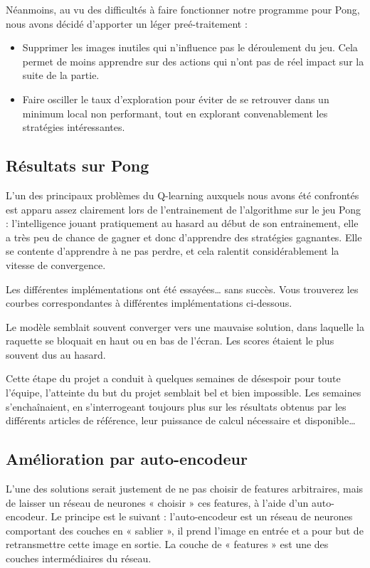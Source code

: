 \documentclass[
    10pt,
    a4paper,
    oneside,
    headinclude,footinclude,
    BCOR=5mm,
    captions=tableabove
]{scrartcl}
\begin{document}
Néanmoins, au vu des difficultés à faire fonctionner notre programme pour Pong, nous avons décidé d'apporter un léger preé-traitement :
\begin{itemize}
	\item Supprimer les images inutiles qui n'influence pas le déroulement du jeu. Cela permet de moins apprendre sur des actions qui n'ont pas de réel impact sur la suite de la partie.
	\item Faire osciller le taux d'exploration pour éviter de se retrouver dans un minimum local non performant, tout en explorant convenablement les stratégies intéressantes.
\end{itemize} 

\subsection{Résultats sur Pong}
L'un des principaux problèmes du Q-learning auxquels nous avons été confrontés est apparu assez clairement lors de l'entrainement de l'algorithme sur le jeu Pong : l'intelligence jouant pratiquement au hasard au début de son entrainement, elle a très peu de chance de gagner et donc d'apprendre des stratégies gagnantes.
Elle se contente d'apprendre à ne pas perdre, et cela ralentit considérablement la vitesse de convergence.

Les différentes implémentations ont été essayées… sans succès. Vous trouverez les courbes correspondantes à différentes implémentations ci-dessous.

Le modèle semblait souvent converger vers une mauvaise solution, dans laquelle la raquette se bloquait en haut ou en bas de l'écran. Les scores étaient le plus souvent dus au hasard.


Cette étape du projet a conduit à quelques semaines de désespoir pour toute l’équipe, l’atteinte du but du projet semblait bel et bien impossible. Les semaines s’enchaînaient, en s’interrogeant toujours plus sur les résultats obtenus par les différents articles de référence, leur puissance de calcul nécessaire et disponible…

\subsection{Amélioration par auto-encodeur}
L’une des solutions serait justement de ne pas choisir de features arbitraires, mais de laisser un réseau de neurones « choisir » ces features, à l’aide d’un auto-encodeur. Le principe est le suivant : l’auto-encodeur est un réseau de neurones comportant des couches en « sablier », il prend l’image en entrée et a pour but de retransmettre cette image en sortie. La couche de « features » est une des couches intermédiaires du réseau. %
\end{document}
